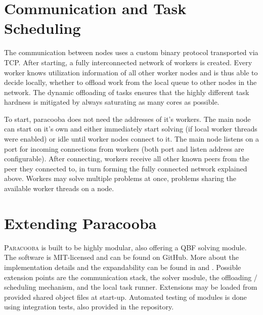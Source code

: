 \documentclass[conference]{IEEEtran}
\newcommand{\paracooba}{\textsc{Paracooba}}
\begin{document}
\section{Communication and Task Scheduling}

The communication between nodes uses a custom binary protocol transported via TCP. After starting, a
fully interconnected network of workers is created. Every worker knows utilization information of
all other worker nodes and is thus able to decide locally, whether to offload work from the local
queue to other nodes in the network. The dynamic offloading of tasks ensures that the highly
different task hardness is mitigated by always saturating as many cores as possible.

To start, paracooba does not need the addresses of it's workers. The main node can start on it's own
and either immediately start solving (if local worker threads were enabled) or idle until worker
nodes connect to it. The main node listens on a port for incoming connections from workers (both
port and listen address are configurable). After connecting, workers receive all other known peers
from the peer they connected to, in turn forming the fully connected network explained above.
Workers may solve multiple problems at once, problems sharing the available worker threads on a
node.

\section{Extending Paracooba}

\paracooba{} is built to be highly modular, also offering a QBF solving module. The software is
MIT-licensed and can be found on GitHub. More about the implementation details and the expandability
can be found in \cite{paracooba} and \cite{heisinger2021distributed}. Possible extension points are
the communication stack, the solver module, the offloading / scheduling mechanism, and the local
task runner. Extensions may be loaded from provided shared object files at start-up. Automated
testing of modules is done using integration tests, also provided in the repository.

\begin{thebibliography}{00}
\end{thebibliography}
\end{document}
